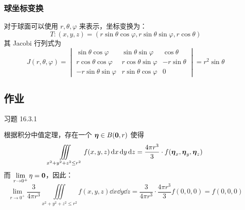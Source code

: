 \subsubsection{球坐标变换}

对于球面可以使用 $r, \theta, \varphi$ 来表示，坐标变换为：
$$
T: (x, y, z) = (r \sin \theta \cos \varphi, r \sin \theta \sin \varphi, r \cos \theta)
$$
其 Jacobi 行列式为
$$
J(r, \theta, \varphi) = \begin{vmatrix}
	\sin \theta \cos \varphi & \sin \theta \sin \varphi & \cos \theta \\
	r \cos \theta \cos \varphi & r \cos \theta \sin \varphi & -r \sin \theta \\
	-r \sin \theta \sin \varphi & r \sin \theta \cos \varphi & 0 
\end{vmatrix} = r^2 \sin \theta
$$

\subsection{作业}

\begin{problem}
	习题 16.3.1
	\begin{solution}
		根据积分中值定理，存在一个 $\boldsymbol{\eta} \in B(\boldsymbol{0}, r)$ 使得
		$$
		\iiint\limits_{x^2 + y^2 + z^2 \le r^2} f(x, y, z) \dd{x} \dd{y} \dd{z} = \frac{4 \pi r^3}{3} \cdot f(\boldsymbol{\eta}_x, \boldsymbol{\eta}_y, \boldsymbol{\eta}_z)
		$$
		而 $\lim\limits_{r \to 0^{+}} \eta = \boldsymbol{0}$，因此：
		$$
		\lim_{r \to 0^{+}} \frac{3}{4 \pi r^3} \iiint\limits_{x^2 + y^2 + z^2 \le r^2} f(x, y, z) \dd{x} \dd{y} \dd{z} = \frac{3}{4 \pi r^3} \cdot \frac{4 \pi r^3}{3} f(0, 0, 0) = f(0, 0, 0)
		$$
	\end{solution}
\end{problem}

